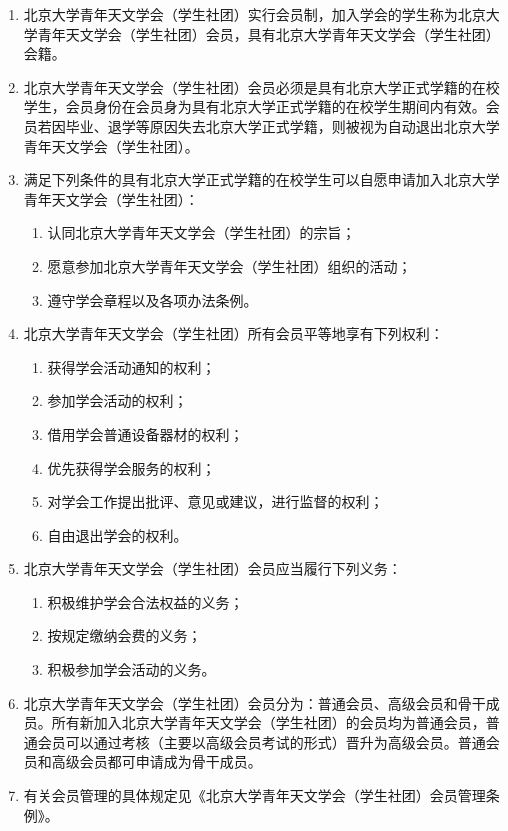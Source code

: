 \begin{enumerate}[resume]
    \item 北京大学青年天文学会（学生社团）实行会员制，加入学会的学生称为北京大学青年天文学会（学生社团）会员，具有北京大学青年天文学会（学生社团）会籍。
    
    \item 北京大学青年天文学会（学生社团）会员必须是具有北京大学正式学籍的在校学生，会员身份在会员身为具有北京大学正式学籍的在校学生期间内有效。会员若因毕业、退学等原因失去北京大学正式学籍，则被视为自动退出北京大学青年天文学会（学生社团）。
    
    \item 满足下列条件的具有北京大学正式学籍的在校学生可以自愿申请加入北京大学青年天文学会（学生社团）：
    
    \begin{enumerate}
        \item 认同北京大学青年天文学会（学生社团）的宗旨；
        \item 愿意参加北京大学青年天文学会（学生社团）组织的活动；
        \item 遵守学会章程以及各项办法条例。
    \end{enumerate}
    
    \item 北京大学青年天文学会（学生社团）所有会员平等地享有下列权利：
    
    \begin{enumerate}
        \item 获得学会活动通知的权利；
        \item 参加学会活动的权利；
        \item 借用学会普通设备器材的权利；
        \item 优先获得学会服务的权利；
        \item 对学会工作提出批评、意见或建议，进行监督的权利；
        \item 自由退出学会的权利。
    \end{enumerate}
    
    \item 北京大学青年天文学会（学生社团）会员应当履行下列义务：
    
    \begin{enumerate}
        \item 积极维护学会合法权益的义务；
        \item 按规定缴纳会费的义务；
        \item 积极参加学会活动的义务。
    \end{enumerate}

    \item 北京大学青年天文学会（学生社团）会员分为：普通会员、高级会员和骨干成员。所有新加入北京大学青年天文学会（学生社团）的会员均为普通会员，普通会员可以通过考核（主要以高级会员考试的形式）晋升为高级会员。普通会员和高级会员都可申请成为骨干成员。

    \item 有关会员管理的具体规定见《北京大学青年天文学会（学生社团）会员管理条例》。
    
\end{enumerate}

